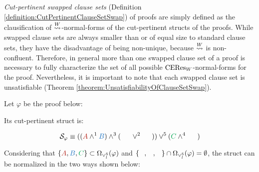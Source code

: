 \documentclass{llncs}
\begin{document}
\emph{Cut-pertinent swapped clause sets} (Definition \ref{definition:CutPertinentClauseSetSwap}) of proofs are simply defined as the clausification of $\normalizePlusTimesS$-normal-forms of the cut-pertinent structs of the proofs. While swapped clause sets are always smaller than or of equal size to standard clause sets, they have the disadvantage of being non-unique, because $\normalizePlusTimesS$ is non-confluent. Therefore, in general more than one swapped clause set of a proof is necessary to fully characterize the set of all possible $\CEResSwap$-normal-forms for the proof. Nevertheless, it is important to note that each swapped clause set is unsatisfiable (Theorem \ref{theorem:UnsatisfiabilityOfClauseSetSwap}).


\begin{example}
\label{example:PlusTimesSwapNormalization}
Let $\varphi$ be the proof below:

\begin{prooftree}
		 
	 
						 
					 
					 
									 
								 
\end{prooftree}

Its cut-pertinent struct is:

$$
\cutpertstruct{\varphi} 
\equiv 
((\hA{A} \structplus^1 \hB{B}) \structplus^3 (\hC{\structdual{B}} \structtimes^2 \hD{\structdual{A}}))
\structtimes^5
(\hE{C} \structplus^4 \hF{\structdual{C}})
$$

Considering that $\{ \hA{A}, \hB{B}, \hE{C}\} \subset \occInference{\varphi}{\vee_l^5}$ and $\{ \hD{A}, \hC{B}, \hF{C} \} \cap \occInference{\varphi}{\vee_l^5} = \emptyset$, the struct can be normalized in the two ways shown below:


\end{example}
\end{document}

